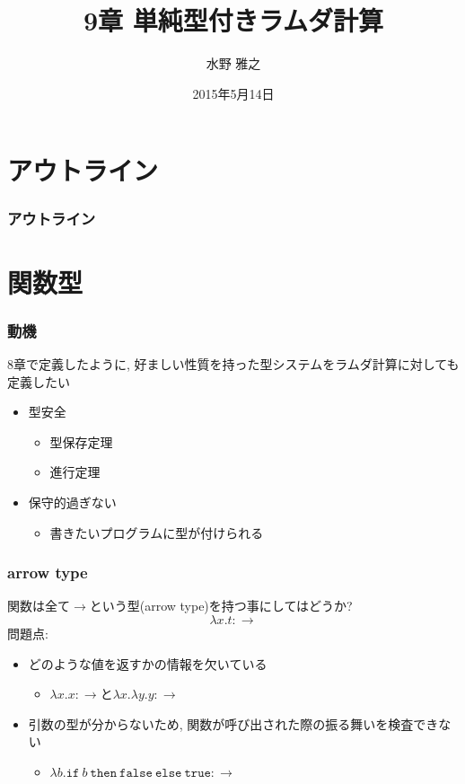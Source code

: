 \documentclass[dvipdfmx,cjk,xcolor=dvipsnames,envcountsect,notheorems,aspectratio=169]{beamer}
\title{9章 単純型付きラムダ計算}
\author{水野 雅之}
\date{2015年5月14日}
\theoremstyle{definition}
\newcommand{\TRUE}{\texttt{true}}
\newcommand{\FALSE}{\texttt{false}}
\newcommand{\IF}{\texttt{if}}
\newcommand{\THEN}{\texttt{then}}
\newcommand{\ELSE}{\texttt{else}}
\begin{document}
\frame[plain]{\titlepage}

\section*{アウトライン}

\begin{frame}
  \frametitle{アウトライン}
  \tableofcontents[sectionstyle=show,subsectionstyle=hide]
\end{frame}

\section{関数型}

\begin{frame}
  \frametitle{動機}
	\Large 8章で定義したように, 好ましい性質を持った型システムをラムダ計算に対しても定義したい
  \begin{itemize}
  \item 型安全
		\begin{itemize}
		\item 型保存定理
		\item 進行定理
		\end{itemize}
  \item 保守的過ぎない
		\begin{itemize}
		\item 書きたいプログラムに型が付けられる
		\end{itemize}
	\end{itemize}
\end{frame}

\begin{frame}
  \frametitle{arrow type}
	\Large 関数は全て$\rightarrow$という型(arrow type)を持つ事にしてはどうか?
	\[\lambda x.t:\rightarrow\]
  \vfill
	問題点:
	\begin{itemize}
	\item どのような値を返すかの情報を欠いている
		\begin{itemize}
		\item $\lambda x.x : \rightarrow$と$\lambda x.\lambda y.y : \rightarrow$
		\end{itemize}
	\item 引数の型が分からないため, 関数が呼び出された際の振る舞いを検査できない
		\begin{itemize}
		\item $\lambda b.\IF~b~\THEN~\FALSE~\ELSE~\TRUE : \rightarrow$
		\end{itemize}
	\end{itemize}
\end{frame}
\end{document}
